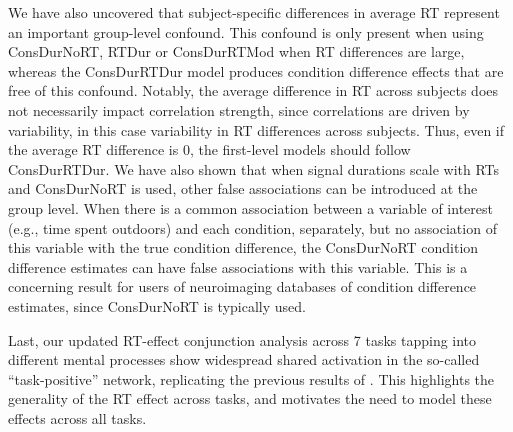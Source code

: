 \documentclass[sn-mathphys,Numbered, super, referee, lineno]{sn-jnl}
\begin{document}
We have also uncovered that subject-specific differences in average RT represent an important group-level confound.  This confound is only present when using ConsDurNoRT, RTDur or ConsDurRTMod when RT differences are large, whereas the ConsDurRTDur model produces condition difference effects that are free of this confound.  Notably, the average difference in RT across subjects does not necessarily impact correlation strength, since correlations are driven by variability, in this case variability in RT differences across subjects.   Thus, even if the average RT difference is 0, the first-level models should follow ConsDurRTDur.  We have also shown that when signal durations scale with RTs and ConsDurNoRT is used, other false associations can be introduced at the group level. When there is a common association between a variable of interest (e.g., time spent outdoors) and each condition, separately, but no association of this variable with the true condition difference, the ConsDurNoRT condition difference estimates can have false associations with this variable. This is a concerning result for users of neuroimaging databases of condition difference estimates, since ConsDurNoRT is typically used.


Last, our updated RT-effect conjunction analysis across 7 tasks tapping into different mental processes show widespread shared activation in the so-called ``task-positive'' network, replicating the previous results of \citet{yarkoni_bold_2009}. This highlights the generality of the RT effect across tasks, and motivates the need to model these effects across all tasks.  

\end{document}
